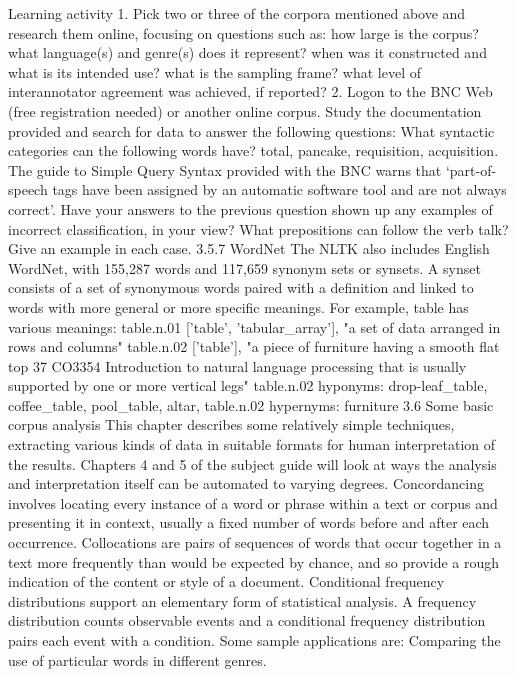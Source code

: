 Learning activity
1. Pick two or three of the corpora mentioned above and research them online, focusing on questions
such as:
how large is the corpus?
what language(s) and genre(s) does it represent?
when was it constructed and what is its intended use?
what is the sampling frame?
what level of interannotator agreement was achieved, if reported?
2. Logon to the BNC Web (free registration needed) or another online corpus. Study the documentation
provided and search for data to answer the following questions:
What syntactic categories can the following words have? total, pancake, requisition, acquisition.
The guide to Simple Query Syntax provided with the BNC warns that ‘part-of-speech tags have
been assigned by an automatic software tool and are not always correct’. Have your answers to
the previous question shown up any examples of incorrect classification, in your view?
What prepositions can follow the verb talk? Give an example in each case.
3.5.7 WordNet
The NLTK also includes English WordNet, with 155,287 words and 117,659
synonym sets or synsets. A synset consists of a set of synonymous words paired with
a definition and linked to words with more general or more specific meanings. For
example, table has various meanings:
table.n.01 ['table', 'tabular\_array'], "a set of data arranged in
rows and columns"
table.n.02 ['table'], "a piece of furniture having a smooth flat top
37
CO3354 Introduction to natural language processing
that is usually supported by one or more vertical legs"
table.n.02 hyponyms: drop-leaf\_table, coffee\_table, pool\_table, altar,
table.n.02 hypernyms: furniture
3.6 Some basic corpus analysis
This chapter describes some relatively simple techniques, extracting various kinds of
data in suitable formats for human interpretation of the results. Chapters 4 and 5 of
the subject guide will look at ways the analysis and interpretation itself can be
automated to varying degrees.
Concordancing involves locating every instance of a word or phrase within a text or
corpus and presenting it in context, usually a fixed number of words before and
after each occurrence.
Collocations are pairs of sequences of words that occur together in a text more
frequently than would be expected by chance, and so provide a rough indication
of the content or style of a document.
Conditional frequency distributions support an elementary form of statistical
analysis. A frequency distribution counts observable events and a conditional
frequency distribution pairs each event with a condition. Some sample
applications are:
Comparing the use of particular words in different genres.
